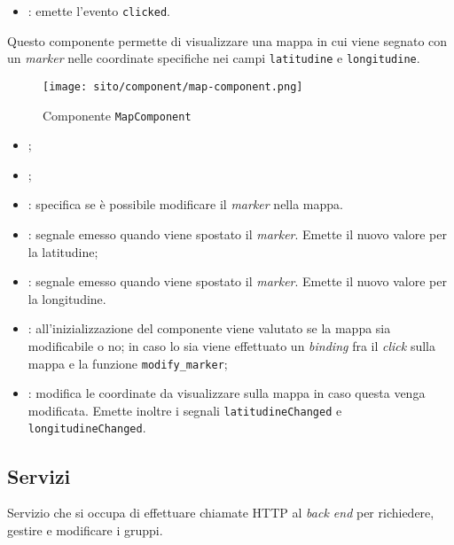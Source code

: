 \begin{itemize}
    \item {}: emette l'evento \texttt{clicked}.
\end{itemize}

\label{par:MapComponent}
Questo componente permette di visualizzare una mappa in cui viene segnato con
un \textit{marker} nelle coordinate specifiche nei campi \texttt{latitudine} e
\texttt{longitudine}.
\begin{figure}[H]
    \centerline{\texttt{[image: sito/component/map-component.png]}}

    \caption{Componente \texttt{MapComponent}}
\end{figure}

\begin{itemize}
    \item {};
    \item {};
    \item {}: specifica se è possibile modificare il
          \textit{marker} nella mappa.
\end{itemize}

\begin{itemize}
    \item {}: segnale emesso quando viene spostato il
          \textit{marker}. Emette il nuovo valore per la latitudine;
    \item {}: segnale emesso quando viene spostato il
          \textit{marker}. Emette il nuovo valore per la longitudine.
\end{itemize}

\begin{itemize}
    \item {}: all'inizializzazione del componente viene valutato
          se la mappa sia modificabile o no; in caso lo sia viene effettuato
          un
          \textit{binding} fra il \textit{click} sulla mappa e la funzione
          \texttt{modify\_marker};
    \item {}: modifica le coordinate da visualizzare sulla
          mappa in caso questa venga modificata. Emette inoltre i segnali
          \texttt{latitudineChanged} e \texttt{longitudineChanged}.
\end{itemize}

\subsection{Servizi}
\label{par:GruppiService}
Servizio che si occupa di effettuare chiamate HTTP al \textit{back end} per
richiedere, gestire e modificare i gruppi.


